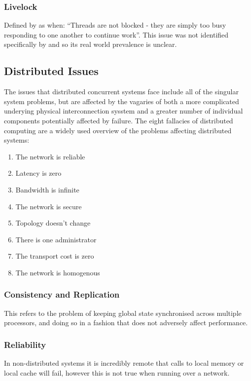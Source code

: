 \documentclass{sig-alternate}
\begin{document}
\subsubsection{Livelock}
Defined by \cite{oracle:_starv_livel} as when: ``Threads are not blocked - they are simply too busy responding to one another to continue work''. This issue was not identified specifically by \cite{shanlu08:_learn_mistak_compr_study_real} and so its real world prevalence is unclear.

\subsection{Distributed Issues}
The issues that distributed concurrent systems face include all of the singular system problems, but are affected by the vagaries of both a more complicated underying physical interconnection sysstem and a greater number of individual components potentially affected by failure. The eight fallacies of distributed computing are a widely used overview of the problems affecting distributed systems:

\begin{enumerate}
\item The network is reliable
\item Latency is zero
\item Bandwidth is infinite
\item The network is secure
\item Topology doesn't change
\item There is one administrator
\item The transport cost is zero
\item The network is homogenous
\end{enumerate}

\subsubsection{Consistency and Replication}
This refers to the problem of keeping global state synchronised across multiple processors, and doing so in a fashion that does not adversely affect performance.

\subsubsection{Reliability}
In non-distributed systems it is incredibly remote that calls to local memory or local cache will fail, however this is not true when running over a network. 
\end{document}
